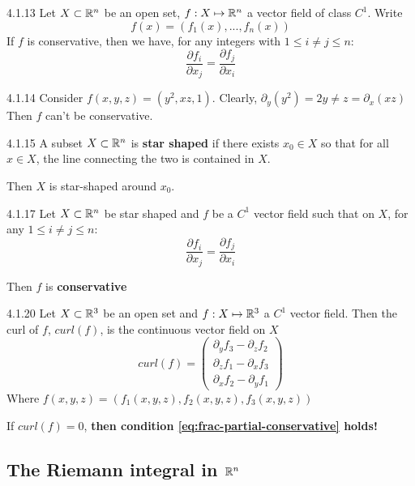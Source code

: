 \begin{proposition}{4.1.13}
    Let $X \subset \mathbb{R}^n$ be an open set, $f: X \mapsto \mathbb{R}^n$ a vector field of class $C^1$. Write 
    \[ f(x) = (f_1(x), ..., f_n(x)) \]
    If $f$ is conservative, then we have, for any integers with $1 \le i \ne j \le n$:
    \[ \frac{\partial f_i}{\partial x_j} = \frac{\partial f_j}{\partial x_i} \]
\end{proposition}

\begin{example}{4.1.14}
    Consider $f(x,y,z) = (y^2, xz, 1)$.
    Clearly, $\partial_y (y^2) = 2y \ne z = \partial_x (xz)$
    Then $f$ can't be conservative.
\end{example}

\begin{definition}{4.1.15}
    A subset $X \subset \mathbb{R}^n$ is \textbf{star shaped} if there exists $x_0 \in X$ so
    that for all $x \in X$, the line connecting the two is contained in $X$.

    Then $X$ is star-shaped around $x_0$.
\end{definition}

\begin{theorem}{4.1.17}
    Let $X \subset \mathbb{R}^n$ be star shaped and $f$ be a $C^1$ vector field such that on $X$, for any $1 \le i \ne j \le n$:
    \begin{equation}
        \label{eq:frac-partial-conservative}
        \frac{\partial f_i}{\partial x_j} = \frac{\partial f_j}{\partial x_i}
    \end{equation}

    Then $f$ is \textbf{conservative}
\end{theorem}

\begin{definition}{4.1.20}
    Let $X \subset \mathbb{R}^3$ be an open set and $f: X \mapsto \mathbb{R}^3$ a $C^1$ vector field.
    Then the curl of $f$, $curl(f)$, is the continuous vector field on $X$
    \[ curl(f) = \begin{pmatrix}
        \partial_y f_3 - \partial_z f_2 \\
        \partial_z f_1 - \partial_x f_3 \\
        \partial_x f_2 - \partial_y f_1
    \end{pmatrix} \]
    Where $f(x,y,z) = (f_1(x,y,z), f_2(x,y,z), f_3(x,y,z))$

    If $curl(f) = 0$, \textbf{then condition \eqref{eq:frac-partial-conservative} holds!}
\end{definition}

\subsection{The Riemann integral in $\mathbb{R}^n$}